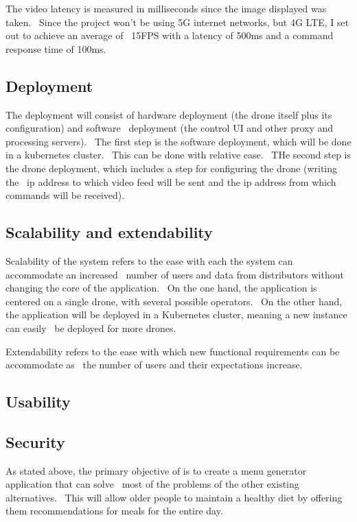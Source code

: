 The video latency is measured in milliseconds since the image displayed was taken. \
Since the project won't be using 5G internet networks, but 4G LTE, I set out to achieve an average of \
15FPS with a latency of 500ms and a command response time of 100ms.

\subsection{Deployment}
\label{subsec:deployment}
The deployment will consist of hardware deployment (the drone itself plus its configuration) and software \
deployment (the control UI and other proxy and processing servers). \
The first step is the software deployment, which will be done in a kubernetes cluster. \
This can be done with relative ease. \
THe second step is the drone deployment, which includes a step for configuring the drone (writing the \
ip address to which video feed will be sent and the ip address from which commands will be received).

\subsection{Scalability and extendability}
\label{subsec:specification-scalability}
Scalability of the system refers to the ease with each the system can accommodate an increased \
number of users and data from distributors without changing the core of the application. \
On the one hand, the  application is centered on a single drone, with several possible operators. \
On the other hand, the application will be deployed in a Kubernetes cluster, meaning a new instance can easily \
be deployed for more drones.

Extendability refers to the ease with which new functional requirements can be accommodate as \
the number of users and their expectations increase.  %

\subsection{Usability}
\label{subsec:specification-usability}

\subsection{Security}
\label{subsec:specification-security}




As stated above, the primary objective of \applicationTitle{} is to create a menu generator application that can solve \
most of the problems of the other existing alternatives. \
This will allow older people to maintain a healthy diet by offering them recommendations for meals for the entire day.

